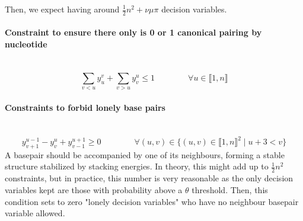 \documentclass{article}
\begin{document}
Then, we expect having around $\frac{1}{2}n^2+\nu \mu \pi$ decision variables.

\paragraph{Constraint to ensure there only is 0 or 1 canonical pairing by nucleotide} ~ 
\begin{equation} \label{constraint:1}
	\sum_{v<u} y^v_u + \sum_{v>u} y^u_v \leq 1 \qquad\qquad \forall u \in \llbracket 1,n \rrbracket
\end{equation}

\paragraph{Constraints to forbid lonely base pairs} ~
\begin{equation} \label{constraint:2}
	y^{u-1}_{v+1} - y^u_v + y^{u+1}_{v-1} \geq 0 \qquad \qquad \forall (u,v) \in \{ (u,v) \in \llbracket 1,n\rrbracket^2 \; | \; u + 3 <v \}
\end{equation}
A basepair should be accompanied by one of its neighbours, forming a stable structure stabilized by stacking energies. In theory, this might add up to \( \frac{1}{2}n^2\) constraints, but in practice, this number is very reasonable as
the only decision variables kept are those with probability above a $\theta$ threshold. 
Then, this condition sets to zero "lonely decision variables" who have no neighbour basepair variable allowed.


\end{document}
